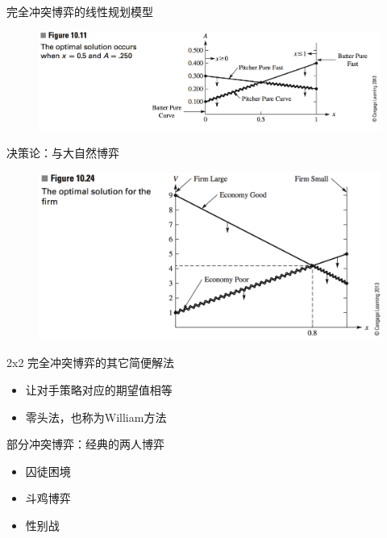 \documentclass[mathserif, table]{beamer}
\begin{document}
\begin{frame}{完全冲突博弈的线性规划模型}
  
  \begin{figure}
    \includegraphics[width=\textwidth{}]{linear.png}
  \end{figure}

\end{frame}

\begin{frame}{决策论：与大自然博弈}
  
  \begin{figure}
    \includegraphics[width=\textwidth{}]{nature.png}
  \end{figure}

\end{frame}

\begin{frame}{2x2 完全冲突博弈的其它简便解法}

  \begin{itemize}
  \item 让对手策略对应的期望值相等
  \item 零头法，也称为William方法
  \end{itemize}
  
\end{frame}

\begin{frame}{部分冲突博弈：经典的两人博弈}
  \begin{itemize}
  \item 囚徒困境
  \item 斗鸡博弈
  \item 性别战
  \end{itemize}
  
\end{frame}
\end{document}
